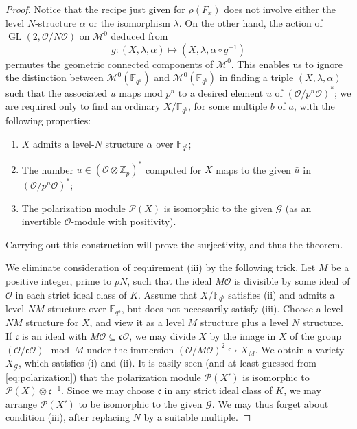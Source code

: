 \documentclass[12pt,a4paper]{article}
\theoremstyle{plain}
\theoremstyle{definition}
\DeclareMathOperator{\GL}{GL}
\newcommand{\OO}{\mathcal{O}}
\newcommand{\Z}{\mathbb{Z}}
\newcommand{\F}{\mathbb{F}}
\begin{document}
\begin{proof}
Notice that the recipe just given for $\rho(F_x)$ does not involve either the level $N$-structure $\alpha$ or the isomorphism $\lambda$. On the other hand, the action of $\GL(2,\OO/N\OO)$ on $\mathscr{M}^0$ deduced from
\[
g:(X,\lambda,\alpha)\mapsto(X,\lambda,\alpha\circ g^{-1})
\]
permutes the geometric connected components of $\mathscr{M}^0$. This enables us to ignore the distinction between $\mathscr{M}^0(\F_{q^a})$ and $\mathscr{M}^0(\F_{q^b})$ in finding a triple $(X,\lambda,\alpha)$ such that the associated $u$ maps mod $p^n$ to a desired element $\bar{u}$ of $(\OO/p^n\OO)^*$; we are required only to find an ordinary $X/\F_{q^b}$, for some multiple $b$ of $a$, with the following properties:
\begin{enumerate}[label=(\roman*)]
\item $X$ admits a level-$N$ structure $\alpha$ over $\F_{q^b}$;
\item The number $u\in(\OO\otimes\Z_p)^*$ computed for $X$ maps to the given $\bar{u}$ in $(\OO/p^n\OO)^*$;
\item The polarization module $\mathscr{P}(X)$ is isomorphic to the given $\mathscr{G}$ (as an invertible $\OO$-module with positivity).
\end{enumerate}
Carrying out this construction will prove the surjectivity, and thus the theorem.

We eliminate consideration of requirement (iii) by the following trick. Let $M$ be a positive integer, prime to $pN$, such that the ideal $M\OO$ is divisible by some ideal of $\OO$ in each strict ideal class of $K$. Assume that $X/\F_{q^b}$ satisfies (ii) and admits a level $NM$ structure over $\F_{q^b}$, but does not necessarily satisfy (iii). Choose a level $NM$ structure for $X$, and view it as a level $M$ structure plus a level $N$ structure. If $\mathfrak{c}$ is an ideal with $M\OO\subseteq\mathfrak{c}\OO$, we may divide $X$ by the image in $X$ of the group $(\OO/\mathfrak{c}\OO)\mod M$ under the immersion $(\OO/M\OO)^2\hookrightarrow X_M$. We obtain a variety $X_{\mathscr{G}}$, which satisfies (i) and (ii). It is easily seen (and at least guessed from \eqref{eq:polarization}) that the polarization module $\mathscr{P}(X')$ is isomorphic to $\mathscr{P}(X)\otimes\mathfrak{c}^{-1}$. Since we may choose $\mathfrak{c}$ in any strict ideal class of $K$, we may arrange $\mathscr{P}(X')$ to be isomorphic to the given $\mathscr{G}$. We may thus forget about condition (iii), after replacing $N$ by a suitable multiple.


\end{proof}
\end{document}
